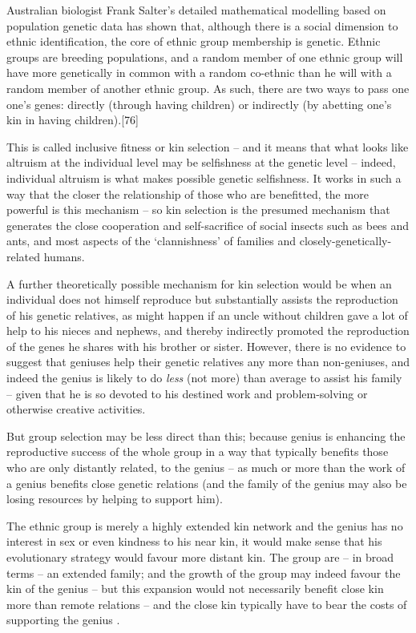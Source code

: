 \documentclass[
]{book}
\begin{document}
Australian biologist Frank Salter's detailed mathematical modelling based on population genetic data has shown that, although there is a social dimension to ethnic identification, the core of ethnic group membership is genetic. Ethnic groups are breeding populations, and a random member of one ethnic group will have more genetically in common with a random co-ethnic than he will with a random member of another ethnic group. As such, there are two ways to pass one one's genes: directly (through having children) or indirectly (by abetting one's kin in having children).{[}76{]}

This is called inclusive fitness or kin selection -- and it means that what looks like altruism at the individual level may be selfishness at the genetic level -- indeed, individual altruism is what makes possible genetic selfishness. It works in such a way that the closer the relationship of those who are benefitted, the more powerful is this mechanism -- so kin selection is the presumed mechanism that generates the close cooperation and self-sacrifice of social insects such as bees and ants, and most aspects of the `clannishness' of families and closely-genetically-related humans.

A further theoretically possible mechanism for kin selection would be when an individual does not himself reproduce but substantially assists the reproduction of his genetic relatives, as might happen if an uncle without children gave a lot of help to his nieces and nephews, and thereby indirectly promoted the reproduction of the genes he shares with his brother or sister. However, there is no evidence to suggest that geniuses help their genetic relatives any more than non-geniuses, and indeed the genius is likely to do \emph{less} (not more) than average to assist his family -- given that he is so devoted to his destined work and problem-solving or otherwise creative activities.

But group selection may be less direct than this; because genius is enhancing the reproductive success of the whole group in a way that typically benefits those who are only distantly related, to the genius -- as much or more than the work of a genius benefits close genetic relations (and the family of the genius may also be losing resources by helping to support him).

The ethnic group is merely a highly extended kin network and the genius has no interest in sex or even kindness to his near kin, it would make sense that his evolutionary strategy would favour more distant kin. The group are -- in broad terms -- an extended family; and the growth of the group may indeed favour the kin of the genius -- but this expansion would not necessarily benefit close kin more than remote relations -- and the close kin typically have to bear the costs of supporting the genius .
\end{document}
